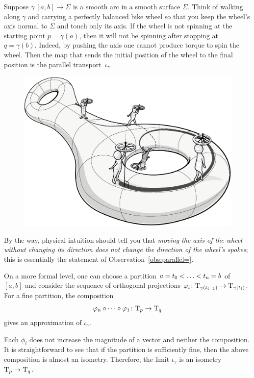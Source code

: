 Suppose $\gamma\:[a,b]\to\Sigma$ is a smooth arc in a smooth surface $\Sigma$.
Think of walking along $\gamma$ and carrying a perfectly balanced bike wheel so that you keep the wheel's axis normal to $\Sigma$ and touch only its axis.
If the wheel is not spinning at the starting point $p=\gamma(a)$, then it will not be spinning after stopping at~$q=\gamma(b)$.
Indeed, by pushing the axis one cannot produce torque to spin the wheel.
Then the map that sends the initial position of the wheel to the final position is the parallel transport~$\iota_\gamma$.

\begin{figure}[ht!]
\vskip-0mm
\centering
\includegraphics[scale=.3]{pics/parallel_transport}
\end{figure}

By the way, physical intuition should tell you that \textit{moving the axis of the wheel without changing its direction does not change the direction of the wheel's spokes};
this is essentially the statement of Observation~\ref{obs:parallel=}.

On a more formal level, one can choose a partition $a=t_0<\dots\z<t_n=b$ of $[a,b]$
and consider the sequence of orthogonal projections $\varphi_i\colon\mathrm{T}_{\gamma(t_{i-1})}\to\mathrm{T}_{\gamma(t_i)}$.
For a fine partition, the composition 
\[\phi_n\circ\dots\circ\phi_1\:\T_p\z\to\T_q\]
gives an approximation of $\iota_\gamma$.

Each $\phi_i$ does not increase the magnitude of a vector and neither the composition.
It is straightforward to see that if the partition is sufficiently fine, then the above composition is almost an isometry.
Therefore, the limit $\iota_\gamma$ is an isometry $\T_p\z\to\T_q$.

